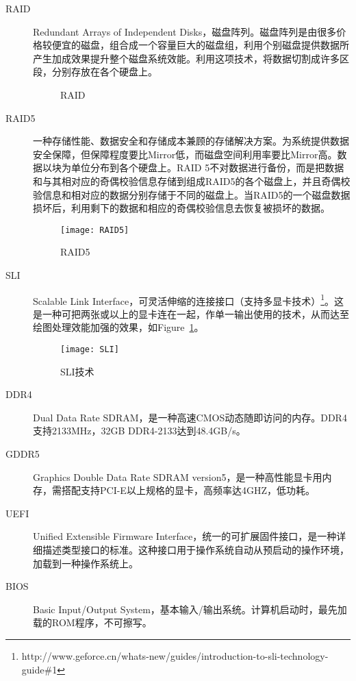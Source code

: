 \begin{description}
\item[RAID] Redundant Arrays of Independent Disks，磁盘阵列。磁盘阵列是由很多价格较便宜的磁盘，组合成一个容量巨大的磁盘组，利用个别磁盘提供数据所产生加成效果提升整个磁盘系统效能。利用这项技术，将数据切割成许多区段，分别存放在各个硬盘上。
\begin{figure}[!ht]
  \centering 
  \caption{RAID}
\end{figure}

\item[RAID5] 一种存储性能、数据安全和存储成本兼顾的存储解决方案。为系统提供数据安全保障，但保障程度要比Mirror低，而磁盘空间利用率要比Mirror高。数据以块为单位分布到各个硬盘上。RAID 5不对数据进行备份，而是把数据和与其相对应的奇偶校验信息存储到组成RAID5的各个磁盘上，并且奇偶校验信息和相对应的数据分别存储于不同的磁盘上。当RAID5的一个磁盘数据损坏后，利用剩下的数据和相应的奇偶校验信息去恢复被损坏的数据。
\begin{figure}[!ht]
\centering
\texttt{[image: RAID5]}
\caption{RAID5}
\end{figure}

\item[SLI] Scalable Link Interface，可灵活伸缩的连接接口（支持多显卡技术）\footnote{http://www.geforce.cn/whats-new/guides/introduction-to-sli-technology-guide\#1}。这是一种可把两张或以上的显卡连在一起，作单一输出使用的技术，从而达至绘图处理效能加强的效果，如Figure~\ref{fig:sli}。
\begin{figure}[!ht]
\centering
\texttt{[image: SLI]}
\caption{SLI技术}
\label{fig:sli}
\end{figure}

\item[DDR4] Dual Data Rate SDRAM，是一种高速CMOS动态随即访问的内存。DDR4支持2133MHz，32GB DDR4-2133达到48.4GB/s。

\item[GDDR5] Graphics Double Data Rate SDRAM version5，是一种高性能显卡用内存，需搭配支持PCI-E以上规格的显卡，高频率达4GHZ，低功耗。

\item[UEFI] Unified Extensible Firmware Interface，统一的可扩展固件接口，是一种详细描述类型接口的标准。这种接口用于操作系统自动从预启动的操作环境，加载到一种操作系统上。

\item[BIOS] Basic Input/Output System，基本输入/输出系统。计算机启动时，最先加载的ROM程序，不可擦写。


\end{description}
